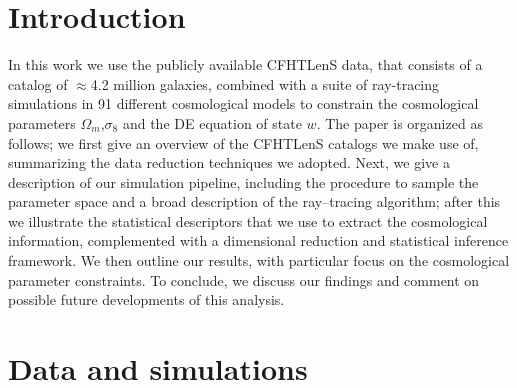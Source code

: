 \documentclass[reprint,aps,prd,superscriptaddress,showkeys,showpacs]{revtex4-1}
\begin{document}


\maketitle



\section{Introduction}
In this work we use the publicly available CFHTLenS data, that consists of a catalog of $\approx$4.2 million galaxies, combined with a suite of ray-tracing simulations in 91 different cosmological models to constrain the cosmological parameters $\Omega_m$,$\sigma_8$ and the DE equation of state $w$. The paper is organized as follows; we first give an overview of the CFHTLenS catalogs we make use of, summarizing the data reduction techniques we adopted. Next, we give a description of our simulation pipeline, including the procedure to sample the parameter space and a broad description of the ray--tracing algorithm; after this we illustrate the statistical descriptors that we use to extract the cosmological information, complemented with a dimensional reduction and statistical inference framework. We then outline our results, with particular focus on the cosmological parameter constraints. To conclude, we discuss our findings and comment on possible future developments of this analysis.  


\section{Data and simulations}
\end{document}
